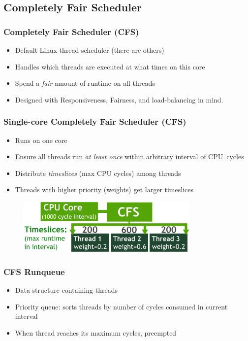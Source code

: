 \documentclass{beamer}
\newcommand{\linespace}{\vskip 0.25cm}
\begin{document}
\subsection[CFS]{Completely Fair Scheduler}
\begin{frame}
\frametitle{Completely Fair Scheduler (CFS)}

\begin{itemize}
\item Default Linux thread scheduler (there are others)
\item Handles which threads are executed at what times on this core
\item Spend a \emph{fair} amount of runtime on all threads
\linespace

\item Designed with Responsiveness, Fairness, and load-balancing in mind.


\end{itemize}
\end{frame}


\begin{frame}
\frametitle{Single-core Completely Fair Scheduler (CFS)}

\begin{itemize}
\item Runs on one core
\item Ensure all threads run \emph{at least once} within arbitrary interval of CPU~cycles
\item Distribute \emph{timeslices} (max CPU cycles) among threads
\item Threads with higher priority (weights) get larger timeslices

\end{itemize}

\begin{figure}
		\includegraphics[width=0.8\textwidth]{Illustrations/CFS}
		\label{fig:cfs}
\end{figure}

\linespace

\end{frame}

\begin{frame}
\frametitle{CFS Runqueue}

\begin{itemize}
	\item Data structure containing threads
	\item Priority queue: sorts threads by number of cycles consumed in current interval
	\item When thread reaches its maximum cycles, preempted
\end{itemize}

\end{frame}
\end{document}
